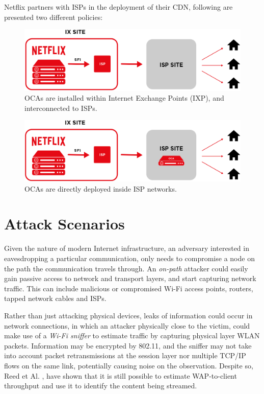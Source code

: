 
Netflix partners with ISPs in the deployment of their CDN, following are
presented two different policies:

\begin{figure}[!htb]
  \centering
  \includegraphics[width=\columnwidth]{img/oca_1.png}
  \caption{OCAs are installed within Internet Exchange Points (IXP), and
  interconnected to ISPs. \cite{netflix_oca}}
  \label{fig:oca_1}
\end{figure}

\begin{figure}[!htb]
  \centering
  \includegraphics[width=\columnwidth]{img/oca_2.png}
  \caption{OCAs are directly deployed inside ISP networks. \cite{netflix_oca}}
  \label{fig:oca_2}
\end{figure}

\section{Attack Scenarios}\label{attack_scenarios}

Given the nature of modern Internet infrastructure, an adversary interested in
eavesdropping a particular communication, only needs to compromise a node on
the path the communication travels through. An \emph{on-path} attacker could
easily gain passive access to network and transport layers, and start capturing
network traffic. This can include malicious or compromised Wi-Fi access
points, routers, tapped network cables and ISPs. 

Rather than just attacking physical devices, leaks of information could occur
in network connections, in which an attacker physically close to the victim,
could make use of a \emph{Wi-Fi sniffer} to estimate traffic by capturing
physical layer WLAN packets.  Information may be encrypted by 802.11, and the
sniffer may not take into account packet retransmissions at the session layer
nor multiple TCP/IP flows on the same link, potentially causing noise on the
observation. Despite so, Reed et Al. \cite{leaky_streams}, have shown that it
is still possible to estimate WAP-to-client throughput and use it to identify
the content being streamed.

